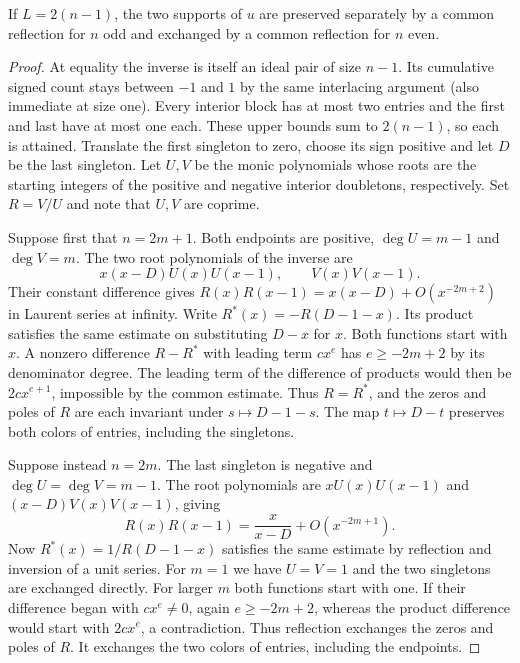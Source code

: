 \begin{proposition}\label{prop:equality}
If \(L=2(n-1)\), the two supports of \(u\) are preserved separately by a common reflection for \(n\) odd and exchanged by a common reflection for \(n\) even.
\end{proposition}
\begin{proof}
At equality the inverse is itself an ideal pair of size \(n-1\). Its cumulative signed count stays between \(-1\) and \(1\) by the same interlacing argument (also immediate at size one). Every interior block has at most two entries and the first and last have at most one each. These upper bounds sum to \(2(n-1)\), so each is attained. Translate the first singleton to zero, choose its sign positive and let \(D\) be the last singleton. Let \(U,V\) be the monic polynomials whose roots are the starting integers of the positive and negative interior doubletons, respectively. Set \(R=V/U\) and note that \(U,V\) are coprime.

Suppose first that \(n=2m+1\). Both endpoints are positive, \(\deg U=m-1\) and \(\deg V=m\). The two root polynomials of the inverse are
\[
 x(x-D)U(x)U(x-1),\qquad V(x)V(x-1).
\]
Their constant difference gives \(R(x)R(x-1)=x(x-D)+O(x^{-2m+2})\) in Laurent series at infinity. Write \(R^*(x)=-R(D-1-x)\). Its product satisfies the same estimate on substituting \(D-x\) for \(x\). Both functions start with \(x\). A nonzero difference \(R-R^*\) with leading term \(c x^e\) has \(e\ge-2m+2\) by its denominator degree. The leading term of the difference of products would then be \(2c x^{e+1}\), impossible by the common estimate. Thus \(R=R^*\), and the zeros and poles of \(R\) are each invariant under \(s\mapsto D-1-s\). The map \(t\mapsto D-t\) preserves both colors of entries, including the singletons.

Suppose instead \(n=2m\). The last singleton is negative and \(\deg U=\deg V=m-1\). The root polynomials are \(xU(x)U(x-1)\) and \((x-D)V(x)V(x-1)\), giving
\[
 R(x)R(x-1)=\frac{x}{x-D}+O(x^{-2m+1}).
\]
Now \(R^*(x)=1/R(D-1-x)\) satisfies the same estimate by reflection and inversion of a unit series. For \(m=1\) we have \(U=V=1\) and the two singletons are exchanged directly. For larger \(m\) both functions start with one. If their difference began with \(cx^e\ne0\), again \(e\ge-2m+2\), whereas the product difference would start with \(2cx^e\), a contradiction. Thus reflection exchanges the zeros and poles of \(R\). It exchanges the two colors of entries, including the endpoints.
\end{proof}

